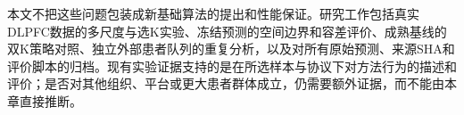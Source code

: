 本文不把这些问题包装成新基础算法的提出和性能保证。研究工作包括真实DLPFC数据的多尺度与选K实验、冻结预测的空间边界和容差评价、成熟基线的双K策略对照、独立外部患者队列的重复分析，以及对所有原始预测、来源SHA和评价脚本的归档。现有实验证据支持的是在所选样本与协议下对方法行为的描述和评价；是否对其他组织、平台或更大患者群体成立，仍需要额外证据，而不能由本章直接推断。
